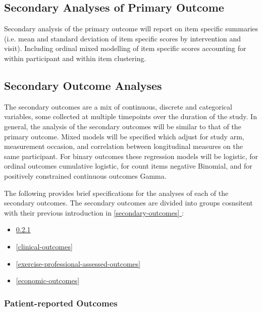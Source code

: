 \documentclass[
]{article}
\providecommand{\tightlist}{%
  \setlength{\itemsep}{0pt}\setlength{\parskip}{0pt}}
\newcommand*{\fullref}[1]{\hyperref[{#1}]{\autoref*{#1} \nameref*{#1}}} %
\begin{document}
\hypertarget{secondary-analyses-primary}{%
  \subsection{Secondary Analyses of Primary Outcome}\label{secondary-analyses-primary}}

Secondary analysis of the primary outcome will report on item specific summaries (i.e. mean and standard deviation of item specific scores by intervention and visit).
Including ordinal mixed modelling of item specific scores accounting for within participant and within item clustering.

\hypertarget{secondary-analyses}{%
  \subsection{Secondary Outcome Analyses}\label{secondary-outcome-analyses}}

The secondary outcomes are a mix of continuous, discrete and categorical variables, some collected at multiple timepoints over the duration of the study.
In general, the analysis of the secondary outcomes will be similar to that of the primary outcome.
Mixed models will be specified which adjust for study arm, measurement occasion, and correlation between longitudinal measures on the same participant.
For binary outcomes these regression models will be logistic, for ordinal outcomes cumulative logistic, for count items negative Binomial, and for positively constrained continuous outcomes Gamma.

The following provides brief specifications for the analyses of each of the secondary outcomes.
The secondary outcomes are divided into groups cosnsitent with their previous introduction in \fullref{secondary-outcomes}:

\begin{itemize}
  \tightlist
  \item \ref{patient-reported-outcomes} 
  \item \ref{clinical-outcomes} 
  \item \ref{exercise-professional-assessed-outcomes} 
  \item \ref{economic-outcomes} 
\end{itemize}

\hypertarget{patient-reported-outcomes}{%
\subsubsection{Patient-reported Outcomes}\label{patient-reported-outcomes}}
\end{document}
